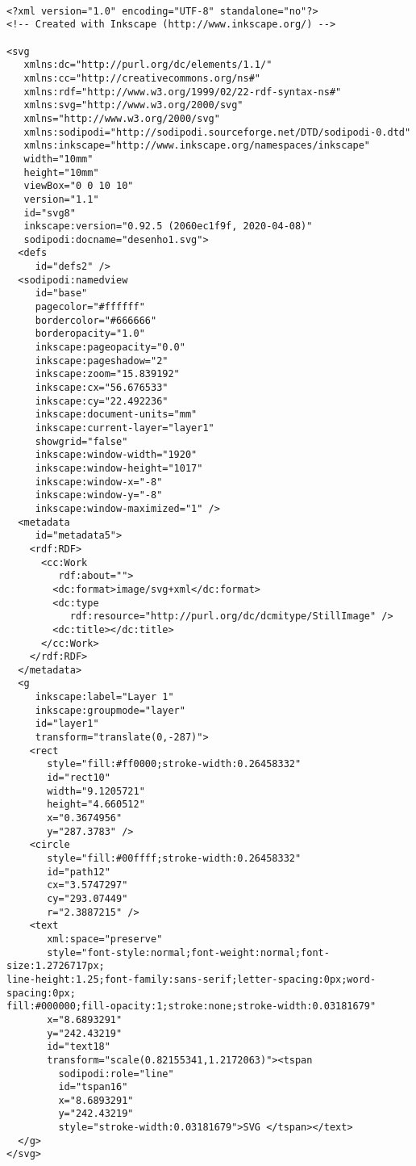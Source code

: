 \begin{verbatim}

<?xml version="1.0" encoding="UTF-8" standalone="no"?>
<!-- Created with Inkscape (http://www.inkscape.org/) -->

<svg
   xmlns:dc="http://purl.org/dc/elements/1.1/"
   xmlns:cc="http://creativecommons.org/ns#"
   xmlns:rdf="http://www.w3.org/1999/02/22-rdf-syntax-ns#"
   xmlns:svg="http://www.w3.org/2000/svg"
   xmlns="http://www.w3.org/2000/svg"
   xmlns:sodipodi="http://sodipodi.sourceforge.net/DTD/sodipodi-0.dtd"
   xmlns:inkscape="http://www.inkscape.org/namespaces/inkscape"
   width="10mm"
   height="10mm"
   viewBox="0 0 10 10"
   version="1.1"
   id="svg8"
   inkscape:version="0.92.5 (2060ec1f9f, 2020-04-08)"
   sodipodi:docname="desenho1.svg">
  <defs
     id="defs2" />
  <sodipodi:namedview
     id="base"
     pagecolor="#ffffff"
     bordercolor="#666666"
     borderopacity="1.0"
     inkscape:pageopacity="0.0"
     inkscape:pageshadow="2"
     inkscape:zoom="15.839192"
     inkscape:cx="56.676533"
     inkscape:cy="22.492236"
     inkscape:document-units="mm"
     inkscape:current-layer="layer1"
     showgrid="false"
     inkscape:window-width="1920"
     inkscape:window-height="1017"
     inkscape:window-x="-8"
     inkscape:window-y="-8"
     inkscape:window-maximized="1" />
  <metadata
     id="metadata5">
    <rdf:RDF>
      <cc:Work
         rdf:about="">
        <dc:format>image/svg+xml</dc:format>
        <dc:type
           rdf:resource="http://purl.org/dc/dcmitype/StillImage" />
        <dc:title></dc:title>
      </cc:Work>
    </rdf:RDF>
  </metadata>
  <g
     inkscape:label="Layer 1"
     inkscape:groupmode="layer"
     id="layer1"
     transform="translate(0,-287)">
    <rect
       style="fill:#ff0000;stroke-width:0.26458332"
       id="rect10"
       width="9.1205721"
       height="4.660512"
       x="0.3674956"
       y="287.3783" />
    <circle
       style="fill:#00ffff;stroke-width:0.26458332"
       id="path12"
       cx="3.5747297"
       cy="293.07449"
       r="2.3887215" />
    <text
       xml:space="preserve"
       style="font-style:normal;font-weight:normal;font-size:1.2726717px;
line-height:1.25;font-family:sans-serif;letter-spacing:0px;word-spacing:0px;
fill:#000000;fill-opacity:1;stroke:none;stroke-width:0.03181679"
       x="8.6893291"
       y="242.43219"
       id="text18"
       transform="scale(0.82155341,1.2172063)"><tspan
         sodipodi:role="line"
         id="tspan16"
         x="8.6893291"
         y="242.43219"
         style="stroke-width:0.03181679">SVG </tspan></text>
  </g>
</svg>


\end{verbatim}
